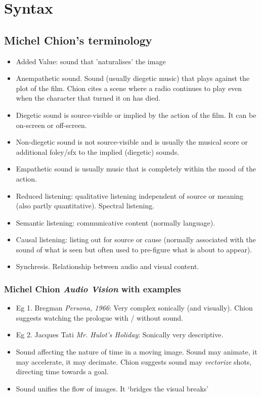 
\chapter{Syntax}
\label{syntax}

\section{Michel Chion's terminology}
\begin{itemize}
\item Added Value: sound that 'naturalises' the image
\item Anempathetic sound. Sound (usually diegetic music) that plays against the plot of the film. Chion cites a scene where a radio continues to play even when the character that turned it on has died.
\item Diegetic sound is source-visible or implied by the action of the film. It can be on-screen or off-screen.
\item Non-diegetic sound is not source-visible and is usually the musical score or additional foley/sfx to the implied (diegetic) sounds.
\item Empathetic sound is usually music that is completely within the mood of the action.
\item Reduced listening: qualitative listening independent of source or meaning (also partly quantitative). Spectral listening.
\item Semantic listening: communicative content (normally language).
\item Causal listening: listing out for source or cause (normally associated with the sound of what is seen but often used to pre-figure what is about to appear). 
\item Synchresis. Relationship between audio and visual content.
\end{itemize}

\subsection{Michel Chion \textit{Audio Vision} with examples}
\begin{itemize}
\item Eg 1. Bregman \textit{Persona, 1966}: Very complex sonically (and visually). Chion suggests watching the prologue with / without sound. 
\item Eg 2. Jacques Tati \textit{Mr. Hulot's Holiday}: Sonically very descriptive. 
\item Sound affecting the nature of time in a moving image. Sound may animate, it may accelerate, it may decimate. Chion suggests sound may \textit{vectorize} shots, directing time towards a goal.
\item Sound unifies the flow of images. It `bridges the visual breaks' \citep[p.47]{chion1990} 

\end{itemize}

